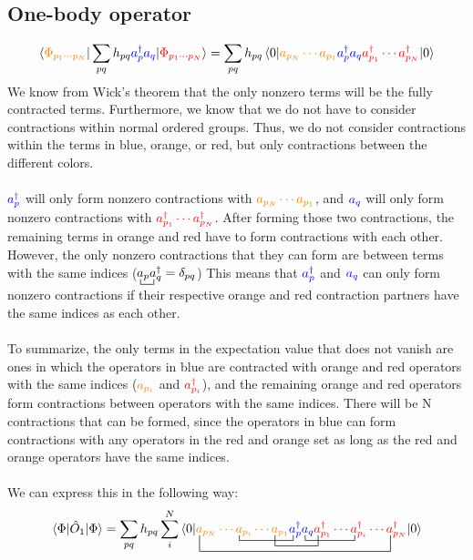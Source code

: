 \documentclass{article}
\newcommand{\ctr}{\bcontraction}
\newcommand{\dg}{\ensuremath{^\dagger} }
\newcommand{\cd}{\ensuremath{\cdots} }
\begin{document}
\subsection{One-body operator}
\[\braket{{\color{orange} \Phi_{p_1 \cd p_N} } | \sum_{pq}   h_{pq}{\color{blue}  a_p^\dagger a_q } | {\color{red} \Phi_{p_1 \cd p_N}}} = 
\sum_{pq}   h_{pq} \braket{ 0| {\color{orange} a_{p_N} \cd a_{p_1} } {\color{blue} a_p^\dagger a_q } {\color{red} a_{p_1}\dg \cd a_{p_N}\dg }| 0} \]
We know from Wick's theorem that the only nonzero terms will be the fully contracted terms. 
Furthermore, we know that we do not have to consider contractions within normal ordered groups. 
Thus, we do not consider contractions within the terms in blue, orange, or red, but only contractions between the different colors.  \\ \\ 
$ {\color{blue} a_p^\dagger}$ will only form nonzero contractions with ${\color{orange} a_{p_N} \cd a_{p_1} } $, and 
$ {\color{blue} a_q }$ will only form nonzero contractions with ${\color{red} a_{p_1}\dg \cd a_{p_N}\dg }$. 
After forming those two contractions, the remaining terms in orange and red have to form contractions with each other. 
However, the only nonzero contractions that they can form are between terms with the same indices ($\ctr{}{a}{{}_p}{a} a_p a_q\dg =  \delta_{pq}$)
This means that $ {\color{blue} a_p^\dagger}$ and  $ {\color{blue} a_q }$ can only form nonzero contractions if their respective orange and red contraction partners have the same indices as each other. 
\\ \\
To summarize, the only terms in the expectation value that does not vanish are ones in which the operators in blue are contracted with orange and red operators with the same indices (${\color{orange} a_{p_i} } $ and 
${\color{red} a_{p_i}\dg}$), and the remaining orange and red operators form contractions between operators with the same indices. There will be N contractions that can be formed, since the operators in blue can form 
contractions with any operators in the red and orange set as long as the red and orange operators have the same indices.  \\ \\
We can express this in the following way: 
\[\braket{\Phi | \hat{O}_1 | \Phi} = \sum_{pq}   h_{pq} \sum_i^N \braket{0| 
\ctr{a_{p_N} \cd}{a}{{}_{p_i} \cd  a_{p_1} }{a}  
\ctr{{\color{orange} a_{p_N} \cd a_{p_i} \cd  a_{p_1} } a_p^\dagger}{a}{{}_q a_{p_1}\dg \cd}{a}
\ctr[2ex]{ a_{p_N} \cd a_{p_i} \cd }{a}{{}_{p_1}  a_p^\dagger a_q }{a}
\ctr[3ex]{}{a}{{}_{p_N} \cd a_{p_i} \cd  a_{p_1}{\color{blue} a_p^\dagger a_q } a_{p_1}\dg \cd a_{p_i}\dg \cd}{a}
{\color{orange} a_{p_N} \cd a_{p_i} \cd  a_{p_1} } {\color{blue} a_p^\dagger a_q } {\color{red} a_{p_1}\dg \cd a_{p_i}\dg \cd a_{p_N}\dg } |0} \]
\end{document}
